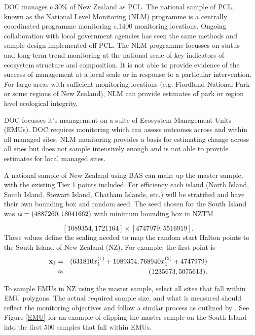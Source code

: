 \documentclass[titlepage]{article}
\begin{document}
DOC manages c.30$\%$ of New Zealand as PCL. The national sample of PCL, known as the National Level Monitoring (NLM) programme is a centrally coordinated programme monitoring c.1400 monitoring locations. Ongoing collaboration with local government agencies has seen the same methods and sample design implemented off PCL. The NLM programme focusses on status and long-term trend monitoring at the national scale of key indicators of ecosystem structure and composition. It is not able to provide evidence of the success of management at a local scale or in response to a particular intervention. For large areas with sufficient monitoring locations (e.g. Fiordland National Park or some regions of New Zealand), NLM can provide estimates of park or region level ecological integrity. 

DOC focusses it's management on a suite of Ecosystem Management Units (EMUs). DOC requires monitoring which can assess outcomes across and within all managed sites. NLM monitoring provides a basis for estimating change across all sites but does not sample intensively enough and is not able to provide estimates for local managed sites.  

A national sample of New Zealand using BAS can make up the master sample, with the existing Tier 1 points included. For efficiency each island (North Island, South Island, Stewart Island, Chatham Islands, etc.) will be stratified and have their own bounding box and random seed. The seed chosen for the South Island was ${\bf u} = (4887260, 18041662)$ with minimum bounding box in NZTM

$$
[1089354, 1721164] \times [4747979, 5516919].
$$
These values define the scaling needed to map the random start Halton points to the South Island of New Zealand (NZ). For example, the first point is
\begin{eqnarray*}
	{\bf x}_1 & = & (631810 x_1^{(1)} + 1089354, 768940 x_1^{(2)} + 4747979)\\
	& \approx & (1235673, 5075613).
\end{eqnarray*}

To sample EMUs in NZ using the master sample, select all sites that fall within EMU polygons. The actual required sample size, and what is measured should reflect the monitoring objectives and follow a similar process as outlined by \citep{Reynolds2016}. See Figure \ref{EMU} for an example of clipping the master sample on the South Island into the first 500 samples that fall within EMUs.
 
\end{document}
